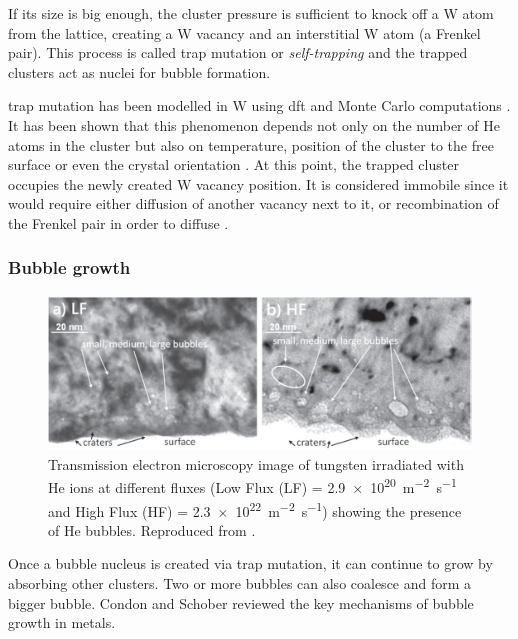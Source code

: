 If its size is big enough, the cluster pressure is sufficient to knock off a \gls{W} atom from the \gls{lattice}, creating a \gls{W} \gls{vacancy} and an interstitial \gls{W} atom (a \gls{Frenkel pair}).
This process is called \gls{trap mutation} or \emph{\gls{self-trapping}} and the trapped clusters act as nuclei for bubble formation.

\Gls{trap mutation} has been modelled in \gls{W} using \gls{dft}  and Monte Carlo computations .
It has been shown that this phenomenon depends not only on the number of \gls{He} atoms in the cluster but also on temperature, position of the cluster to the free surface or even the crystal orientation .
At this point, the trapped cluster occupies the newly created \gls{W} \gls{vacancy} position.
It is considered immobile since it would require either diffusion of another \gls{vacancy} next to it, or recombination of the Frenkel pair in order to diffuse .

\subsubsection{Bubble growth}

\begin{figure} [h!]
    \centering
    \includegraphics[width=\linewidth]{Figures/Chapter1/helium_bubbles_ialovega.jpg}
    \caption{Transmission electron microscopy image of tungsten irradiated with He ions at different fluxes (Low Flux (LF) = \SI{2.9e20}{m^{-2}.s^{-1}} and High Flux (HF) = \SI{2.3e22}{m^{-2}.s^{-1}}) showing the presence of He bubbles. Reproduced from \cite{ialovega_hydrogen_2020}.}
\end{figure}

Once a bubble nucleus is created via \gls{trap mutation}, it can continue to grow by absorbing other clusters.
Two or more bubbles can also coalesce and form a bigger bubble.
Condon and Schober  reviewed the key mechanisms of bubble growth in metals.

